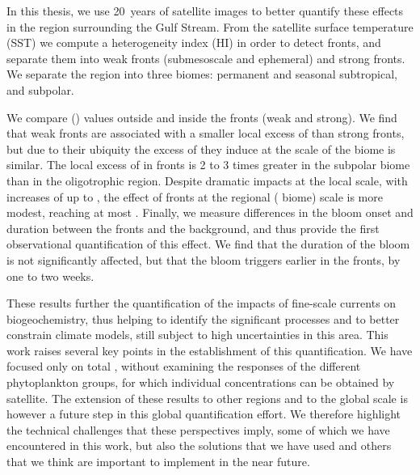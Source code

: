 In this thesis, we use 20~years of satellite images to better quantify these effects in the region surrounding the Gulf Stream.
From the satellite surface temperature (SST) we compute a heterogeneity index (HI) in order to detect fronts, and separate them into weak fronts (submesoscale and ephemeral) and strong fronts.
We separate the region into three biomes: permanent and seasonal subtropical, and subpolar.

We compare  () values outside and inside the fronts (weak and strong).
We find that weak fronts are associated with a smaller local excess of  than strong fronts, but due to their ubiquity the excess of  they induce at the scale of the biome is similar.
The local excess of  in fronts is 2 to 3 times greater in the subpolar biome than in the oligotrophic region.
Despite dramatic impacts at the local scale, with increases of up to , the effect of fronts at the regional ( biome) scale is more modest, reaching at most .
Finally, we measure differences in the bloom onset and duration between the fronts and the background, and thus provide the first observational quantification of this effect.
We find that the duration of the bloom is not significantly affected, but that the bloom triggers earlier in the fronts, by one to two weeks.

These results further the quantification of the impacts of fine-scale currents on biogeochemistry, thus helping to identify the significant processes and to better constrain climate models, still subject to high uncertainties in this area.
This work raises several key points in the establishment of this quantification.
We have focused only on total , without examining the responses of the different phytoplankton groups, for which individual concentrations can be obtained by satellite.
The extension of these results to other regions and to the global scale is however a future step in this global quantification effort.
We therefore highlight the technical challenges that these perspectives imply, some of which we have encountered in this work, but also the solutions that we have used and others that we think are important to implement in the near future.



